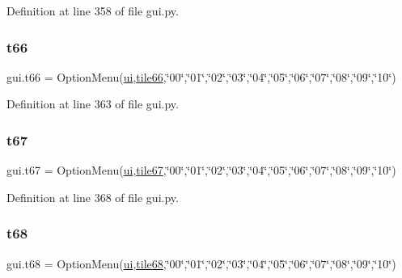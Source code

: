 Definition at line 358 of file gui.\+py.

\mbox{\label{namespacegui_ae64ba32cdbadf068fcc5d130d160f2eb}} 
\subsubsection{\texorpdfstring{t66}{t66}}
{\footnotesize\ttfamily gui.\+t66 = Option\+Menu(\mbox{\hyperlink{namespacegui_a40ab7281456eadbea2dc2038f5c24fa1}{ui}},\mbox{\hyperlink{namespacegui_ae611eb5c07dd6a1b2c69b5d1367f7e1d}{tile66}},\char`\"{}00\char`\"{},\char`\"{}01\char`\"{},\char`\"{}02\char`\"{},\char`\"{}03\char`\"{},\char`\"{}04\char`\"{},\char`\"{}05\char`\"{},\char`\"{}06\char`\"{},\char`\"{}07\char`\"{},\char`\"{}08\char`\"{},\char`\"{}09\char`\"{},\char`\"{}10\char`\"{})}



Definition at line 363 of file gui.\+py.

\mbox{\label{namespacegui_ae7cb1d419e0c3fdbb1131162c9ea1944}} 
\subsubsection{\texorpdfstring{t67}{t67}}
{\footnotesize\ttfamily gui.\+t67 = Option\+Menu(\mbox{\hyperlink{namespacegui_a40ab7281456eadbea2dc2038f5c24fa1}{ui}},\mbox{\hyperlink{namespacegui_a6385015d5e2e403c5f8d30ef5339646e}{tile67}},\char`\"{}00\char`\"{},\char`\"{}01\char`\"{},\char`\"{}02\char`\"{},\char`\"{}03\char`\"{},\char`\"{}04\char`\"{},\char`\"{}05\char`\"{},\char`\"{}06\char`\"{},\char`\"{}07\char`\"{},\char`\"{}08\char`\"{},\char`\"{}09\char`\"{},\char`\"{}10\char`\"{})}



Definition at line 368 of file gui.\+py.

\mbox{\label{namespacegui_a3f63b7bb66be287743b185d084f54726}} 
\subsubsection{\texorpdfstring{t68}{t68}}
{\footnotesize\ttfamily gui.\+t68 = Option\+Menu(\mbox{\hyperlink{namespacegui_a40ab7281456eadbea2dc2038f5c24fa1}{ui}},\mbox{\hyperlink{namespacegui_a04d5995a5f47514361d4d9b85b41fdd4}{tile68}},\char`\"{}00\char`\"{},\char`\"{}01\char`\"{},\char`\"{}02\char`\"{},\char`\"{}03\char`\"{},\char`\"{}04\char`\"{},\char`\"{}05\char`\"{},\char`\"{}06\char`\"{},\char`\"{}07\char`\"{},\char`\"{}08\char`\"{},\char`\"{}09\char`\"{},\char`\"{}10\char`\"{})}



